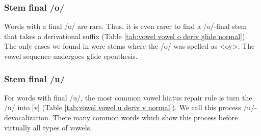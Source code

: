 {	
	\subsubsection{Stem final /o/}\label{section:syllable:VowelHiatus:Derived:O}
	
	Words with a final /o/ are rare. Thus, it is even rarer to find a /o/-final stem that takes a derivational suffix (Table \ref{tab:vowel vowel o deriv glide normal}).  The only cases we found in \citeauthor{kouyoumdjian-1970-DictionaryArmenianEnglish} were stems where the /o/ was spelled as <oy>.  The vowel sequence undergoes glide epenthesis.
	
	\begin{table}[H]
		\centering
		\caption{Glide epenthesis in derivation for  stems with final [o]}
		\label{tab:vowel vowel o deriv glide normal}
		\end{table}
	
	\subsubsection{Stem final /u/}\label{section:syllable:VowelHiatus:Derived:U}
	For words with final /u/, the most common vowel hiatus repair rule is turn the /u/ into [v] (Table \ref{tab:vowel vowel u deriv v normal}). We call this process /u/-devocalization. There many common words which show this process before virtually all types of vowels. 
	
}

